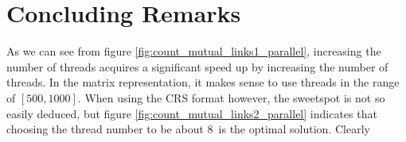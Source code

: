 \documentclass[english,notitlepage, reprint]{revtex4-1}  %
\begin{document}
\section{Concluding Remarks}
As we can see from figure \ref{fig:count_mutual_links1_parallel}, increasing the number of threads acquires a significant speed up by increasing the number of threads. In the matrix representation, it makes sense to use threads in the range of $[500, 1000]$. When using the CRS format however, the sweetspot is not so easily deduced, but figure \ref{fig:count_mutual_links2_parallel} indicates that choosing the thread number to be about $8$ is the optimal solution. Clearly
\end{document}
